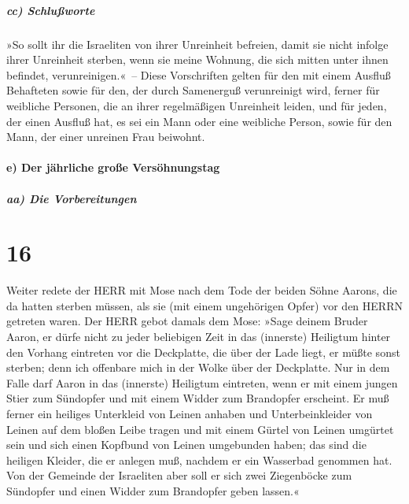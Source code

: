 \hypertarget{cc-schluuxdfworte}{%
\subparagraph{cc) Schlußworte}\label{cc-schluuxdfworte}}

»So sollt ihr die Israeliten von ihrer Unreinheit
befreien, damit sie nicht infolge ihrer Unreinheit sterben, wenn sie
meine Wohnung, die sich mitten unter ihnen befindet, verunreinigen.«~--
Diese Vorschriften gelten für den mit einem Ausfluß
Behafteten sowie für den, der durch Samenerguß verunreinigt wird,
ferner für weibliche Personen, die an ihrer regelmäßigen
Unreinheit leiden, und für jeden, der einen Ausfluß hat, es sei ein Mann
oder eine weibliche Person, sowie für den Mann, der einer unreinen Frau
beiwohnt.

\hypertarget{e-der-juxe4hrliche-grouxdfe-versuxf6hnungstag}{%
\paragraph{e) Der jährliche große
Versöhnungstag}\label{e-der-juxe4hrliche-grouxdfe-versuxf6hnungstag}}

\hypertarget{aa-die-vorbereitungen-1}{%
\subparagraph{aa) Die Vorbereitungen}\label{aa-die-vorbereitungen-1}}

\hypertarget{section-15}{%
\section{16}\label{section-15}}

Weiter redete der HERR mit Mose nach dem Tode der beiden
Söhne Aarons, die da hatten sterben müssen, als sie (mit einem
ungehörigen Opfer) vor den HERRN getreten waren. Der HERR
gebot damals dem Mose: »Sage deinem Bruder Aaron, er dürfe nicht zu
jeder beliebigen Zeit in das (innerste) Heiligtum hinter den Vorhang
eintreten vor die Deckplatte, die über der Lade liegt, er müßte sonst
sterben; denn ich offenbare mich in der Wolke über der Deckplatte.
Nur in dem Falle darf Aaron in das (innerste) Heiligtum
eintreten, wenn er mit einem jungen Stier zum Sündopfer und mit einem
Widder zum Brandopfer erscheint. Er muß ferner ein
heiliges Unterkleid von Leinen anhaben und Unterbeinkleider von Leinen
auf dem bloßen Leibe tragen und mit einem Gürtel von Leinen umgürtet
sein und sich einen Kopfbund von Leinen umgebunden haben; das sind die
heiligen Kleider, die er anlegen muß, nachdem er ein Wasserbad genommen
hat. Von der Gemeinde der Israeliten aber soll er sich
zwei Ziegenböcke zum Sündopfer und einen Widder zum Brandopfer geben
lassen.«

